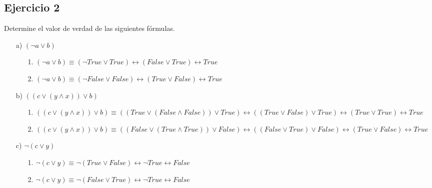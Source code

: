 \documentclass[10pt,a4paper]{article}
\begin{document}
\subsection*{Ejercicio 2}
Determine el valor de verdad de las siguientes fórmulas.
\begin{enumerate}
\item[a)] $(\neg a \vee b)$
	\begin{enumerate}
	\item[1.] $(\neg a \vee b)\equiv (\neg True \vee True)\leftrightarrow (False \vee True)\leftrightarrow True$
	\item[2.]$(\neg a \vee b)\equiv (\neg False \vee False)\leftrightarrow (True \vee False)\leftrightarrow True$
	\end{enumerate}


\item[b)]$((c \vee (y \wedge x))\vee b)$
	\begin{enumerate}
	\item[1.]$((c \vee (y \wedge x))\vee b)\equiv ((True \vee (False \wedge False))\vee True)\leftrightarrow ((True \vee False)\vee True)\leftrightarrow (True \vee True)\leftrightarrow True$
	\item[2.]$((c \vee (y \wedge x))\vee b)\equiv ((False \vee (True \wedge True))\vee False)\leftrightarrow ((False \vee True)\vee False)\leftrightarrow (True\vee False)\leftrightarrow True$ 
	\end{enumerate}
	
\item[c)]$\neg(c\vee y)$
	\begin{enumerate}
	\item[1.]$\neg(c\vee y)\equiv \neg(True\vee False)\leftrightarrow \neg True\leftrightarrow False$
	\item[2.]$\neg(c\vee y)\equiv \neg(False\vee True)\leftrightarrow \neg True\leftrightarrow False$ 
	\end{enumerate}
	

\end{enumerate}
\end{document}
